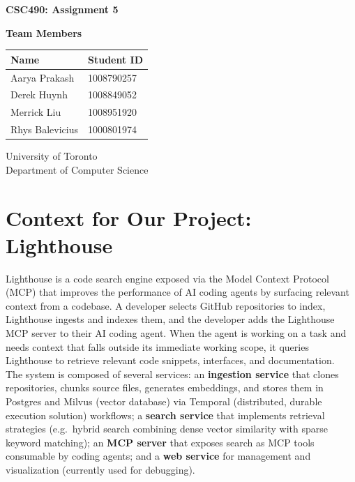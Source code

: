 \documentclass[a4paper,12pt]{article}
\begin{document}
\begin{titlepage}
    \centering
    \vspace*{1cm}
    
    \Huge
    \textbf{CSC490: Assignment 5}
    
    \vspace{0.5cm}
    
    \vspace{1.5cm}
    
    \textbf{Team Members}
    
    \vspace{0.8cm}
    
    \large
    \begin{tabular}{ll}
        \textbf{Name} & \textbf{Student ID} \\
        \midrule
        Aarya Prakash & 1008790257 \\
        Derek Huynh & 1008849052 \\
        Merrick Liu & 1008951920 \\
        Rhys Balevicius & 1000801974 \\
    \end{tabular}
    
    \vfill
    
    \large
    University of Toronto\\
    Department of Computer Science    
\end{titlepage}

\section{Context for Our Project: Lighthouse}

Lighthouse is a code search engine exposed via the Model Context Protocol (MCP) that
improves the performance of AI coding agents by surfacing relevant context from a
codebase. A developer selects GitHub repositories to index, Lighthouse ingests and
indexes them, and the developer adds the Lighthouse MCP server to their AI coding
agent. When the agent is working on a task and needs context that falls outside its
immediate working scope, it queries Lighthouse to retrieve relevant code snippets,
interfaces, and documentation.\\

The system is composed of several services: an \textbf{ingestion service} that clones
repositories, chunks source files, generates embeddings, and stores them in Postgres
and Milvus (vector database) via Temporal (distributed, durable execution solution) workflows; a \textbf{search service} that implements retrieval
strategies (e.g.\ hybrid search combining dense vector similarity with sparse keyword
matching); an \textbf{MCP server} that exposes search as MCP tools consumable by coding
agents; and a \textbf{web service} for management and visualization (currently used for debugging).
\end{document}
